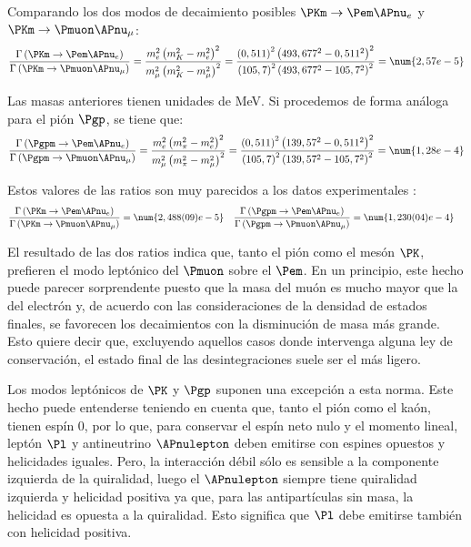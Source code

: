 Comparando los dos modos de decaimiento posibles $\PKm \rightarrow \Pem \APnu_{e}$ y $\PKm \rightarrow \Pmuon \APnu_{\mu}$:
\begin{equation}
\dfrac{\Gamma \left( \PKm \rightarrow \Pem \APnu_{e}\right) }{\Gamma \left( \PKm \rightarrow \Pmuon \APnu_{\mu}\right) }=\dfrac{m_{e}^{2}\left( m_{K}^{2}-m_{e}^{2}\right) ^{2}}{m_{\mu }^{2}\left( m_{K}^{2}-m_{\mu }^{2}\right) ^{2}}=\dfrac{\left( 0,511\right) ^{2}\left( 493,677^{2}-0,511^{2}\right) ^{2}}{\left( 105,7\right) ^{2}\left( 493,677^{2}-105,7^{2}\right) ^{2}}=\num{2,57e-5}\label{eq:BRkaon}
\end{equation}

Las masas anteriores tienen unidades de MeV. Si procedemos de forma análoga para el pión $\Pgp$, se tiene que:
\begin{equation}
\dfrac{\Gamma \left( \Pgpm \rightarrow \Pem \APnu_{e}\right) }{\Gamma \left( \Pgpm \rightarrow \Pmuon \APnu_{\mu}\right) }=\dfrac{m_{e}^{2}\left( m_{\pi}^{2}-m_{e}^{2}\right) ^{2}}{m_{\mu }^{2}\left( m_{\pi}^{2}-m_{\mu }^{2}\right) ^{2}}=\dfrac{\left( 0,511\right) ^{2}\left(139,57^{2}-0,511^{2}\right) ^{2}}{\left( 105,7\right) ^{2}\left( 139,57^{2}-105,7^{2}\right) ^{2}}=\num{1,28e-4}\label{eq:BRpion}
\end{equation}

Estos valores de las ratios son muy parecidos a los datos experimentales \cite{tanabashi} \cite{olive}:
\begin{align}
\dfrac{\Gamma \left( \PKm \rightarrow \Pem \APnu_{e}\right)}{\Gamma \left( \PKm \rightarrow \Pmuon \APnu_{\mu}\right)} &= \num{2,488(09)e-5} & \dfrac{\Gamma \left( \Pgpm \rightarrow \Pem \APnu_{e}\right)}{\Gamma \left( \Pgpm \rightarrow \Pmuon \APnu_{\mu}\right)} &= \num{1,230(04)e-4}\label{eq:BRexp}
\end{align}

El resultado de las dos ratios indica que, tanto el pión como el mesón $\PK$, prefieren el modo leptónico del $\Pmuon$ sobre el $\Pem$. En un principio, este hecho puede parecer sorprendente puesto que la masa del muón es mucho mayor que la del electrón y, de acuerdo con las consideraciones de la densidad de estados finales, se favorecen los decaimientos con la disminución de masa más grande. Esto quiere decir que, excluyendo aquellos casos donde intervenga alguna ley de conservación, el estado final de las desintegraciones suele ser el más ligero. 

Los modos leptónicos de $\PK$ y $\Pgp$ suponen una excepción a esta norma. Este hecho puede entenderse teniendo en cuenta que, tanto el pión como el kaón, tienen espín 0, por lo que, para conservar el espín neto nulo y el momento lineal, leptón $\Pl$ y antineutrino $\APnulepton$ deben emitirse con espines opuestos y helicidades iguales. Pero, la interacción débil sólo es sensible a la componente izquierda de la quiralidad, luego el $\APnulepton$ siempre tiene quiralidad izquierda y helicidad positiva ya que, para las antipartículas sin masa, la helicidad es opuesta a la quiralidad. Esto significa que $\Pl$ debe emitirse también con helicidad positiva.

